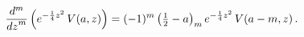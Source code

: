 \[\frac{{d}^{m}}{{dz}^{m}}\left(e^{-\frac{1}{4}z^{2}}\mathop{V\/}\nolimits\!%
\left(a,z\right)\right)=(-1)^{m}\left(\tfrac{1}{2}-a\right)_{m}e^{-\frac{1}{4}%
z^{2}}\mathop{V\/}\nolimits\!\left(a-m,z\right).\]